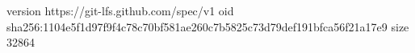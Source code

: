 version https://git-lfs.github.com/spec/v1
oid sha256:1104e5f1d97f9f4c78c70bf581ae260c7b5825c73d79def191bfca56f21a17e9
size 32864

